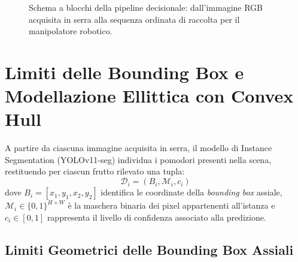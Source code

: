 \begin{figure}[htbp]
\caption{Schema a blocchi della pipeline decisionale: dall'immagine RGB acquisita in serra alla sequenza ordinata di raccolta per il manipolatore robotico.}
\label{fig:pipeline_schema}
\end{figure}

\section{Limiti delle Bounding Box e Modellazione Ellittica con Convex Hull}
\label{sec:modellazione_geometrica}

A partire da ciascuna immagine acquisita in serra, il modello di Instance Segmentation (YOLOv11-seg) individua i pomodori presenti nella scena, restituendo per ciascun frutto rilevato una tupla:
\begin{equation}
    \mathcal{D}_i = \left( B_i, \mathcal{M}_i, c_i \right)
\end{equation}
dove $B_i = [x_1, y_1, x_2, y_2]$ identifica le coordinate della \textit{bounding box} assiale, $\mathcal{M}_i \in \{0, 1\}^{H \times W}$ è la maschera binaria dei pixel appartenenti all'istanza e $c_i \in [0, 1]$ rappresenta il livello di confidenza associato alla predizione.

\subsection{Limiti Geometrici delle Bounding Box Assiali}
\label{subsec:limiti_bbox}

